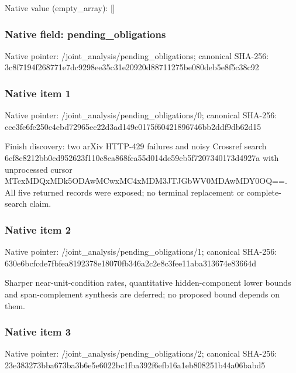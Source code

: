 \documentclass[10pt,a4paper]{article}
\begin{document}
Native value (empty\_\allowbreak{}array): []

\subsubsection{Native field: pending\_\allowbreak{}obligations}
Native pointer: /joint\_\allowbreak{}analysis/pending\_\allowbreak{}obligations; canonical SHA-256: 3c8f7194f268771e7dc9298ee35c31e20920d88711275be080deb5e8f5c38c92

\subsubsection{Native item 1}
Native pointer: /joint\_\allowbreak{}analysis/pending\_\allowbreak{}obligations/0; canonical SHA-256: cce3fe6fe250c4cbd72965ec22d3ad149c0175f60421896746bb2ddf9db62d15

\begingroup\raggedright\sloppy Finish discovery:\allowbreak{} two arXiv HTTP-429 failures and noisy Crossref search 6cf8c8212bb0cd952623f110c8ca868fca55d014de59cb5f7207340173d4927a with unprocessed cursor MTcxMDQxMDk5ODAwMCwxMC4xMDM3JTJGbWV0MDAwMDY0OQ=\allowbreak{}=\allowbreak{}. All five returned records were exposed;\allowbreak{} no terminal replacement or complete-search claim.\par\endgroup

\subsubsection{Native item 2}
Native pointer: /joint\_\allowbreak{}analysis/pending\_\allowbreak{}obligations/1; canonical SHA-256: 630e6bcfcde7fbfea8192378e18070fb346a2c2e8c3fee11aba313674e83664d

\begingroup\raggedright\sloppy Sharper near-unit-condition rates,\allowbreak{} quantitative hidden-component lower bounds and span-complement synthesis are deferred;\allowbreak{} no proposed bound depends on them.\par\endgroup

\subsubsection{Native item 3}
Native pointer: /joint\_\allowbreak{}analysis/pending\_\allowbreak{}obligations/2; canonical SHA-256: 23e383273bba673ba3b6e5e6022bc1fba392f6efb16a1eb808251b44a06babd5
\end{document}
